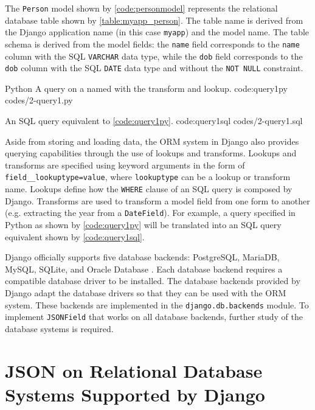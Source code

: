 The \verb|Person| model shown by \autoref{code:personmodel} represents the
relational database table shown by \autoref{table:myapp_person}. The table name
is derived from the Django application name (in this case \verb|myapp|) and the
model name. The table schema is derived from the model fields: the \verb|name|
field corresponds to the \verb|name| column with the SQL \verb|VARCHAR| data
type, while the \verb|dob| field corresponds to the \verb|dob| column with the
SQL \verb|DATE| data type and without the \verb|NOT NULL| constraint.

\listing
{Python}
{A query on a  named  with the 
transform and  lookup.}
{code:query1py}
{codes/2-query1.py}

{An SQL query equivalent to \autoref{code:query1py}.}
{code:query1sql}
{codes/2-query1.sql}

Aside from storing and loading data, the ORM system in Django also provides
querying capabilities through the use of lookups and transforms. Lookups and
transforms are specified using keyword arguments in the form of
\verb|field__lookuptype=value|, where \verb|lookuptype| can be a lookup or
transform name. Lookups define how the \verb|WHERE| clause of an SQL query is
composed by Django. Transforms are used to transform a model field from one
form to another (e.g. extracting the year from a \verb|DateField|). For
example, a query specified in Python as shown by \autoref{code:query1py} will
be translated into an SQL query equivalent shown by \autoref{code:query1sql}.

Django officially supports five database backends: PostgreSQL, MariaDB, MySQL,
SQLite, and Oracle Database \cite{django:databases}. Each database backend
requires a compatible database driver to be installed. The database backends
provided by Django adapt the database drivers so that they can be used with the
ORM system. These backends are implemented in the \verb|django.db.backends|
module. To implement \verb|JSONField| that works on all database backends,
further study of the database systems is required.

\section{JSON on Relational Database Systems Supported by Django}

